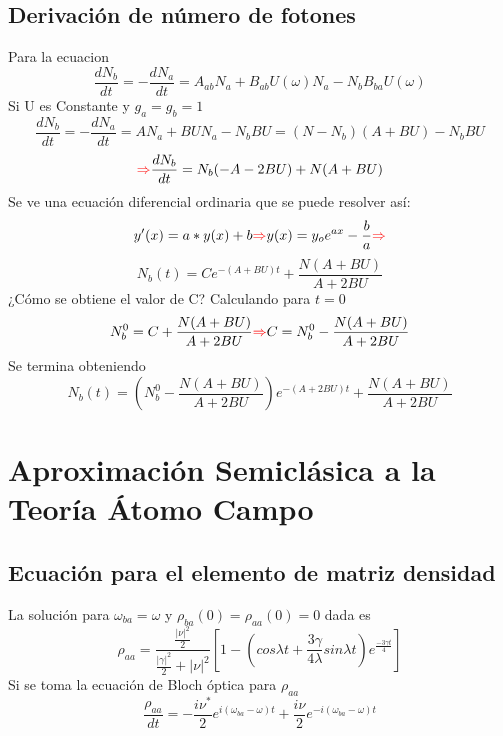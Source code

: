 \documentclass{book}
\begin{document}
\subsection{Derivación de número de fotones} Para la ecuacion \begin{equation}{ \frac{dN_b}{dt}=-\frac{dN_a}{dt}=A_{ab}N_a+B_{ab}U(\omega)N_a-N_bB_{ba}U(\omega)}\end{equation} Si U es Constante y $g_a=g_b=1$
\begin{equation}{ \frac{dN_b}{dt}=-\frac{dN_a}{dt}=AN_a+BUN_a-N_bBU=(N-N_b)(A+BU)-N_bBU}\end{equation}
\begin{equation}{ \textcolor{red}{\Rightarrow} \frac{dN_b}{dt}=N_b(-A-2BU)+N(A+BU)}\end{equation}
Se ve una ecuación diferencial ordinaria que se puede resolver así:
\begin{equation}{ y^\prime(x)=a*y(x)+b \textcolor{red}{\Rightarrow} y(x)=y_oe^{ax}-\frac{b}{a} \textcolor{red}{\Rightarrow}} \end{equation}
\begin{equation}{ N_b(t)=Ce^{-(A+BU)t}+\frac{N(A+BU)}{A+2BU}}\end{equation}
¿Cómo se obtiene el valor de C? Calculando para $t=0$
\begin{equation}{ N_b^0= C+\frac{N(A+BU)}{A+2BU}\textcolor{red}{\Rightarrow} C=N_b^0-\frac{N(A+BU)}{A+2BU}}\end{equation}
Se termina obteniendo
\begin{equation}{ N_b(t)=(N_b^0-\frac{N(A+BU)}{A+2BU})e^{-(A+2BU)t}+\frac{N(A+BU)}{A+2BU}}\end{equation}
\section{Aproximación Semiclásica a la Teoría Átomo Campo}
\subsection{Ecuación para el elemento de matriz densidad} La solución para $\omega_{ba}=\omega$ y ${\rho_{ba}(0)=\rho_{aa}(0)=0}$ dada es \begin{equation}{\rho_{aa}=\frac{\frac{\lvert\nu\rvert^2}{2}}{\frac{\lvert\gamma\rvert^2}{2}+\lvert\nu\rvert^2}[1-(cos\lambda t+\frac{3\gamma}{4\lambda}sin\lambda t)e^{\frac{-3\gamma t}{4}}]} \end{equation}
Si se toma la ecuación de Bloch óptica para ${\rho_{aa}}$
\begin{equation}{\frac{\rho_{aa}}{dt}=-\frac{i\nu^*}{2}e^{i(\omega_{ba}-\omega)t}+\frac{i\nu}{2}e^{-i(\omega_{ba}-\omega)t}} \end{equation}
\end{document}
